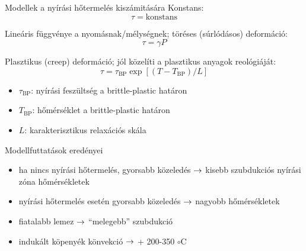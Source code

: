 \documentclass{beamer}
\begin{document}
\begin{frame}{Modellek a nyírási hőtermelés kiszámitására}
    Konstans:
    \[
        \tau = \text{konstans}
    \]

    Lineáris függvénye a nyomásnak/mélységnek; töréses (súrlódásos) deformáció:
    \[
        \tau = \gamma P
    \]
    
    
    Plasztikus (creep) deformáció; jól közelíti a plasztikus anyagok reológiáját:
    \[
        \tau = \tau_{\text{BP}} \exp{[(T - T_{\text{BP}}) / L]}
    \]
    
    \begin{itemize}
        \item $\tau_{\text{BP}}$: nyírási feszültség a brittle-plastic határon
        \item $T_{\text{BP}}$: hőmérséklet a brittle-plastic határon
        \item $L$: karakterisztikus relaxációs skála
    \end{itemize}
\end{frame}


\begin{frame}{Modellfuttatások eredényei}
    \begin{minipage}[c]{0.65\textwidth}
        \centering
        \begin{itemize}
            \item ha nincs nyírási hőtermelés, gyorsabb közeledés $\rightarrow$ kisebb szubdukciós nyírási zóna hőmérsékletek
        \end{itemize}
    \end{minipage}
    \begin{minipage}[c]{0.3\textwidth}
        \begin{itemize}
            \item nyírási hőtermelés esetén gyorsabb közeledés $\rightarrow$ nagyobb hőmérsékletek
            \item fiatalabb lemez $\rightarrow$ ``melegebb'' szubdukció
            \item indukált köpenyék könvekció $\rightarrow$ + 200-350 $\circ$C
        \end{itemize}
    \end{minipage}
\end{frame}
\end{document}
